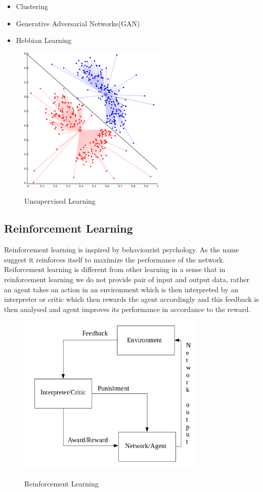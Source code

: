 \documentclass[12pt, a4paper]{report}
\begin{document}
\begin{itemize}
	\item{Clustering}
	\item{Generative Adversarial Networks(GAN)}
	\item{Hebbian Learning}
\end{itemize}
\par
\begin{figure}[h]
\centering	
\includegraphics[width=7cm]{cluster.png}\\
\caption{Unsupervised Learning}
\label{fig:cluster}
\end{figure} 

\subsection{Reinforcement Learning}\label{sec:ReinforcementLearning}

Reinforcement learning is inspired by behaviourist psychology. As the name suggest it reinforces itself to maximize the performance of the network. Reiforcement learning is different from other learning in a sense that in reinforcement learning we do not provide pair of input and output data, rather an agent takes an action in an environment which is then interpreted by an interpreter or critic which then rewards the agent accordingly and this feedback is then analysed and agent improves its performance in accordance to the reward.\\ \par

\begin{figure}[h]
\centering	
\includegraphics[width=9cm]{reinforcement.png}\\
\caption{Reinforcement Learning}
\label{fig:reinforcement}
\end{figure} 
\end{document}
